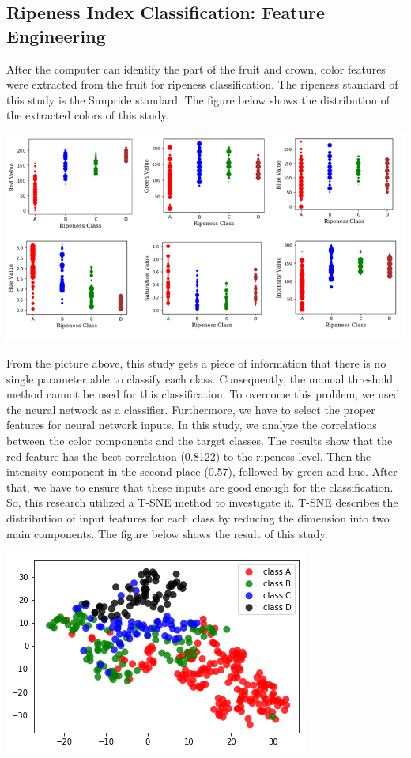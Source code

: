 \documentclass[11pt]{article}
\begin{document}
\begin{linenumbers}
\subsection{Ripeness Index Classification: Feature Engineering}
After the computer can identify the part of the fruit and crown, color features were extracted from the fruit for ripeness classification. The ripeness standard of this study is the Sunpride standard. The figure below shows the distribution of the extracted colors of this study.
\begin{center}
	\includegraphics[scale=0.65]{images/colors}
\end{center}
From the picture above, this study gets a piece of information that there is no single parameter able to classify each class. Consequently, the manual threshold method cannot be used for this classification. To overcome this problem, we used the neural network as a classifier.
Furthermore, we have to select the proper features for neural network inputs. In this study, we analyze the correlations between the color components and the target classes. The results show that the red feature has the best correlation (0.8122) to the ripeness level. Then the intensity component in the second place (0.57), followed by green and hue. After that, we have to ensure that these inputs are good enough for the classification. So, this research utilized a T-SNE method to investigate it. T-SNE describes the distribution of input features for each class by reducing the dimension into two main components. The figure below shows the result of this study.
\begin{center}
	\includegraphics[scale=0.55]{images/tsne}

\end{center}
\end{linenumbers}
\end{document}
